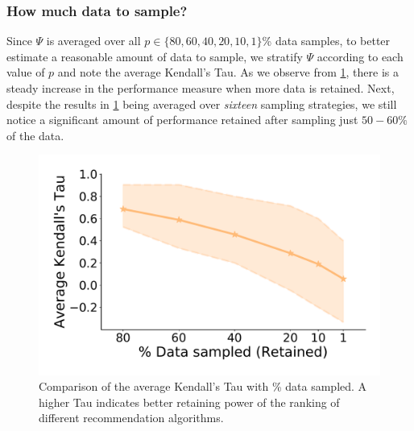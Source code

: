 \subsubsection{How much data to sample? \ \ } Since $\Psi$ is averaged over all $p \in \{ 80, 60, 40, 20, 10, 1 \}$\% data samples, to better estimate a reasonable amount of data to sample, we stratify $\Psi$ according to each value of $p$ and note the average Kendall's Tau. As we observe from \cref{percent_sampling_vs_tau}, %
there is a steady increase in the performance measure when more data is retained. Next, despite the results in \cref{percent_sampling_vs_tau} being averaged over \emph{sixteen} sampling strategies, we still notice a significant amount of performance retained after sampling just $50-60\%$ of the data. %
\begin{figure}[ht!] 
    \centering
    \vspace{-0.2cm}
    \includegraphics[width=0.6\linewidth]{figures/percent_sampling_vs_tau.pdf}
    \vspace{-0.25cm}
    \caption{Comparison of the average Kendall's Tau with \% data sampled. A higher Tau indicates better retaining power of the ranking of different recommendation algorithms.}
    \label{percent_sampling_vs_tau}
    \vspace{-0.3cm}
\end{figure} 

